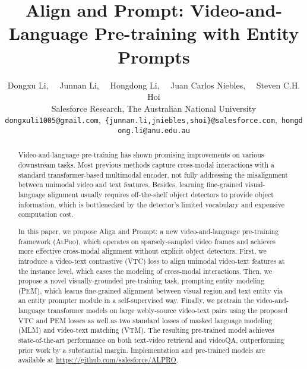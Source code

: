 \documentclass[10pt,twocolumn,letterpaper]{article}
\begin{document}
\title{Align and Prompt: Video-and-Language Pre-training with Entity Prompts}

\author{Dongxu Li,~~
Junnan Li,~~
Hongdong Li,~~
Juan Carlos Niebles,~~
Steven C.H. Hoi \\Salesforce Research, The Australian National University\\
{\tt\small dongxuli1005@gmail.com},~{\tt\small \{junnan.li,jniebles,shoi\}@salesforce.com},~{\tt\small hongdong.li@anu.edu.au}
}





\maketitle

\def\DX#1{{\color{red}{\bf [DX:}{\it{#1}}{\bf ]}}}
\def\HL#1{{\color{blue}{\bf [HLi:}{\it{#1}}{\bf ]}}}

\def\name{\textsc{AlPro}}

\def\Vec#1{{\boldsymbol{#1}}}
\def\Mat#1{{\boldsymbol{#1}}} \begin{abstract}
Video-and-language pre-training has shown promising improvements on various downstream tasks. Most previous methods capture cross-modal interactions with a standard transformer-based multimodal encoder, not fully addressing the misalignment between unimodal video and text features. Besides, learning fine-grained visual-language alignment usually requires off-the-shelf object detectors to provide object information, which is bottlenecked by the detector's limited vocabulary and expensive computation cost. 


In this paper, we propose Align and Prompt: a new video-and-language pre-training framework (\name), which operates on sparsely-sampled video frames and achieves more effective cross-modal alignment without explicit object detectors. First, we introduce a video-text contrastive (VTC) loss to align unimodal video-text features at the instance level, which eases the modeling of cross-modal interactions.
Then, we propose a novel visually-grounded pre-training task, prompting entity modeling (PEM), which learns fine-grained alignment between visual region and text entity via an entity prompter module in a self-supervised way. Finally, we pretrain the video-and-language transformer models on large webly-source video-text pairs using the proposed VTC and PEM losses as well as two standard losses of masked language modeling (MLM) and video-text matching (VTM). 
The resulting pre-trained model achieves state-of-the-art performance on both text-video retrieval and videoQA,
outperforming prior work by a substantial margin.
Implementation and pre-trained models are available at \small\url{https://github.com/salesforce/ALPRO}.



\end{abstract} \vspace{-1em}
\end{document}

